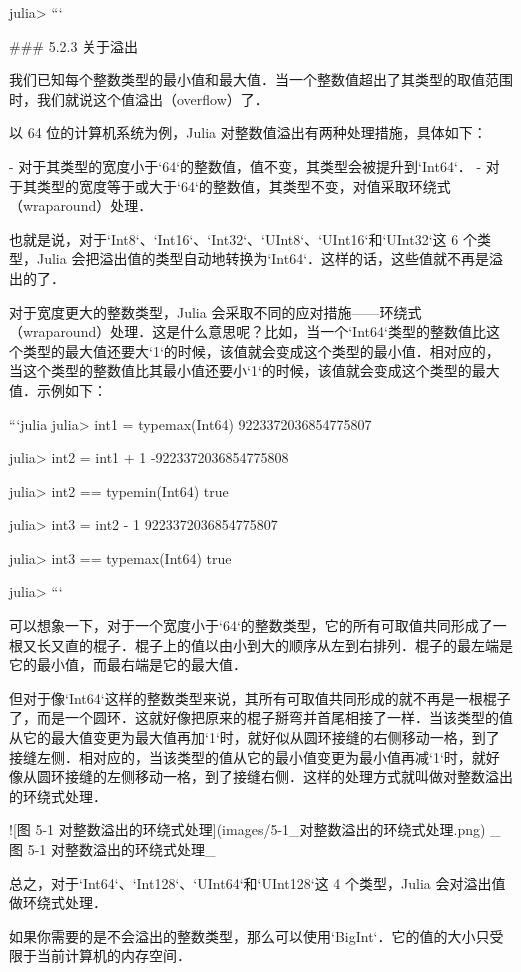 julia> 
```

### 5.2.3 关于溢出

我们已知每个整数类型的最小值和最大值．当一个整数值超出了其类型的取值范围时，我们就说这个值溢出（overflow）了．

以 64 位的计算机系统为例，Julia 对整数值溢出有两种处理措施，具体如下：

- 对于其类型的宽度小于`64`的整数值，值不变，其类型会被提升到`Int64`．
- 对于其类型的宽度等于或大于`64`的整数值，其类型不变，对值采取环绕式（wraparound）处理．

也就是说，对于`Int8`、`Int16`、`Int32`‌、`UInt8`、`UInt16`和`UInt32`这 6 个类型，Julia 会把溢出值的类型自动地转换为`Int64`．这样的话，这些值就不再是溢出的了．

对于宽度更大的整数类型，Julia 会采取不同的应对措施——环绕式（wraparound）处理．这是什么意思呢？比如，当一个`Int64`类型的整数值比这个类型的最大值还要大`1`的时候，该值就会变成这个类型的最小值．相对应的，当这个类型的整数值比其最小值还要小`1`的时候，该值就会变成这个类型的最大值．示例如下：

```julia
julia> int1 = typemax(Int64)
9223372036854775807

julia> int2 = int1 + 1
-9223372036854775808

julia> int2 == typemin(Int64)
true

julia> int3 = int2 - 1
9223372036854775807

julia> int3 == typemax(Int64)
true

julia> 
```

可以想象一下，对于一个宽度小于`64`的整数类型，它的所有可取值共同形成了一根又长又直的棍子．棍子上的值以由小到大的顺序从左到右排列．棍子的最左端是它的最小值，而最右端是它的最大值．

但对于像`Int64`这样的整数类型来说，其所有可取值共同形成的就不再是一根棍子了，而是一个圆环．这就好像把原来的棍子掰弯并首尾相接了一样．当该类型的值从它的最大值变更为最大值再加`1`时，就好似从圆环接缝的右侧移动一格，到了接缝左侧．相对应的，当该类型的值从它的最小值变更为最小值再减`1`时，就好像从圆环接缝的左侧移动一格，到了接缝右侧．这样的处理方式就叫做对整数溢出的环绕式处理．

![图 5-1 对整数溢出的环绕式处理](images/5-1_对整数溢出的环绕式处理.png)
_图 5-1 对整数溢出的环绕式处理_

总之，对于`Int64`、`Int128`、`UInt64`和`UInt128`这 4 个类型，Julia 会对溢出值做环绕式处理．

如果你需要的是不会溢出的整数类型，那么可以使用`BigInt`．它的值的大小只受限于当前计算机的内存空间．

